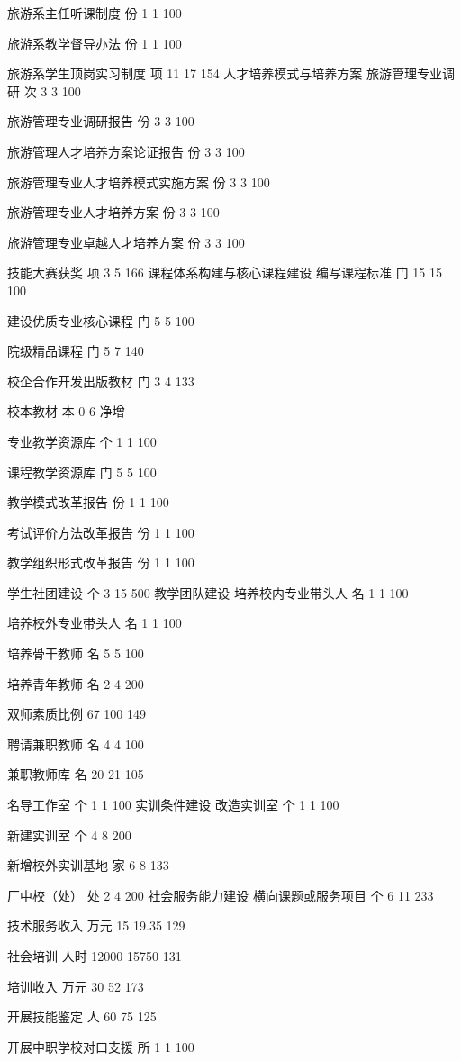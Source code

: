 旅游系主任听课制度
份
1
1
100%

旅游系教学督导办法
份
1
1
100%

旅游系学生顶岗实习制度
项
11
17
154%
人才培养模式与培养方案
旅游管理专业调研
次
3
3
100%

旅游管理专业调研报告
份
3
3
100%

旅游管理人才培养方案论证报告
份
3
3
100%

旅游管理专业人才培养模式实施方案
份
3
3
100%

旅游管理专业人才培养方案
份
3
3
100%

旅游管理专业卓越人才培养方案
份
3
3
100%

技能大赛获奖
项
3
5
166%
课程体系构建与核心课程建设
编写课程标准
门
15
15
100%

建设优质专业核心课程 
门
5
5
100%

院级精品课程 
门
5
7
140%

校企合作开发出版教材 
门
3
4
133%

校本教材 
本
0
6
净增

专业教学资源库 
个
1
1
100%

课程教学资源库 
门
5
5
100%

教学模式改革报告
份
1
1
100%

考试评价方法改革报告 
份
1
1
100%

教学组织形式改革报告 
份
1
1
100%

学生社团建设 
个
3
15
500%
教学团队建设
培养校内专业带头人
名
1
1
100%

培养校外专业带头人 
名
1
1
100%

培养骨干教师 
名
5
5
100%

培养青年教师
名
2
4
200%

双师素质比例
%
67
100
149%

聘请兼职教师 
名
4
4
100%

兼职教师库 
名
20
21
105%

名导工作室
个
1
1
100%
实训条件建设
改造实训室 
个
1
1
100%

新建实训室 
个
4
8
200%

新增校外实训基地 
家
6
8
133%

厂中校（处）
处
2
4
200%
社会服务能力建设
横向课题或服务项目
个
6
11
233%

技术服务收入
万元
15
19.35
129%

社会培训
人时
12000
15750
131%

培训收入 
万元
30
52
173%

开展技能鉴定 
人
60
75
125%

开展中职学校对口支援 
所
1
1
100%

